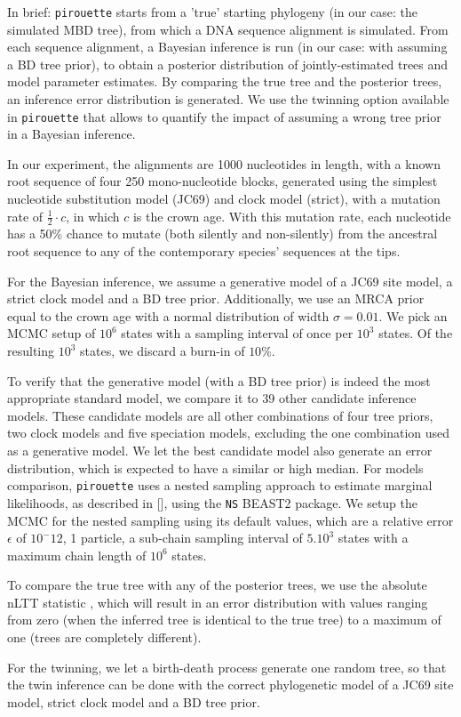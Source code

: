 In brief: \verb;pirouette; starts from 
a 'true' starting phylogeny (in our case: the simulated MBD tree), 
from which a DNA sequence alignment is simulated. 
From each sequence alignment, a Bayesian 
inference is run (in our case: with assuming a BD tree prior), 
to obtain a posterior distribution of jointly-estimated trees and model parameter estimates.
By comparing the true tree and the posterior trees, 
an inference error distribution is generated.
We use the twinning option available in \verb;pirouette;
that allows to quantify the impact of assuming a wrong
tree prior in a Bayesian inference.

In our experiment, the alignments are 1000 nucleotides in length, 
with a known root sequence of four 250 mono-nucleotide blocks, 
generated using the simplest nucleotide substitution model (JC69) 
and clock model (strict), with a mutation rate of $\frac{1}{2}\cdot c$,
in which $c$ is the crown age. 
With this mutation rate, each nucleotide has a 50\% chance
to mutate (both silently and non-silently) from the ancestral root sequence 
to any of the contemporary species' sequences at the tips.

For the Bayesian inference, we assume a generative model of 
a JC69 site model, a strict clock model and a BD tree prior. 
Additionally, we use an MRCA prior equal to the crown age with a normal distribution 
of width $\sigma = 0.01$. We pick an MCMC setup of $10^6$ states
with a sampling interval of once per $10^3$ states. Of the resulting
$10^3$ states, we discard a burn-in of $10\%$.

To verify that the generative model (with a BD tree prior) is
indeed the most appropriate standard model, we compare it to
39 other candidate inference models. These candidate models 
are all other combinations of four tree priors, 
two clock models and five speciation models, 
excluding the one combination used as a generative model.
We let the best candidate model also generate an error distribution,
which is expected to have a similar or high median.
For models comparison, \verb;pirouette; uses a nested sampling approach
to estimate marginal likelihoods,
as described in [\cite{maturana2018model}], 
using the \verb;NS; BEAST2 package. We setup the MCMC for the nested sampling
using its default values, which are a relative error $\epsilon$ of $10^-12$, 
1 particle, a sub-chain sampling interval of $5.10^3$ states with
a maximum chain length of $10^6$ states.

To compare the true tree with any of the posterior trees,
we use the absolute nLTT statistic \citet{janzen2015},
which will result in an error distribution with values
ranging from zero (when the inferred tree is identical 
to the true tree) to a maximum of one (trees are completely different).

For the twinning, we let a birth-death process generate one random tree,
so that the twin inference can be done with the correct phylogenetic
model of a JC69 site model, strict clock model and a BD tree prior.
